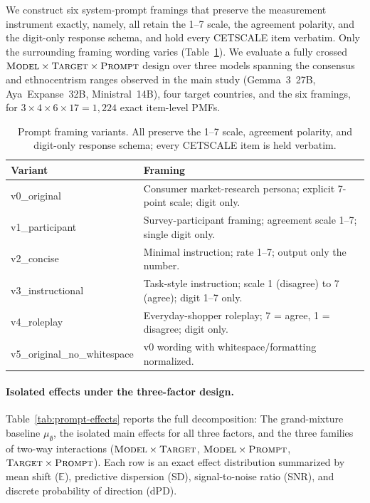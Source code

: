 We construct six system-prompt framings that preserve the measurement instrument exactly, namely, all retain the 1--7 scale, the agreement polarity, and the digit-only response schema, and hold every CETSCALE item verbatim. 
Only the surrounding framing wording varies (Table~\ref{tab:prompt-variants}). 
We evaluate a fully crossed $\textsc{Model}\times\textsc{Target}\times\textsc{Prompt}$ design over three models spanning the consensus and ethnocentrism ranges observed in the main study (Gemma~3~27B, Aya~Expanse~32B, Ministral~14B), four target countries, and the six framings, for $3\times4\times6\times17=1{,}224$ exact item-level PMFs.

\begin{table}[htbp]
  \caption{Prompt framing variants. All preserve the 1--7 scale, agreement
  polarity, and digit-only response schema; every CETSCALE item is held verbatim.}
  \label{tab:prompt-variants}
  \centering
  \begin{small}
  \begin{tabular}{@{}p{3.4cm}p{8.6cm}@{}}
    \toprule
    \textbf{Variant} & \textbf{Framing} \\
    \midrule
    v0\_original & Consumer market-research persona; explicit 7-point scale; digit only. \\
    v1\_participant & Survey-participant framing; agreement scale 1--7; single digit only. \\
    v2\_concise & Minimal instruction; rate 1--7; output only the number. \\
    v3\_instructional & Task-style instruction; scale 1 (disagree) to 7 (agree); digit 1--7 only. \\
    v4\_roleplay & Everyday-shopper roleplay; 7 = agree, 1 = disagree; digit only. \\
    v5\_original\_no\_whitespace & v0 wording with whitespace/formatting normalized. \\
    \bottomrule
  \end{tabular}
  \end{small}
\end{table}

\paragraph{Isolated effects under the three-factor design.}
Table~\ref{tab:prompt-effects} reports the full decomposition: 
The grand-mixture baseline $\mu_\emptyset$, the isolated main effects for all three factors, and the
three families of two-way interactions
($\textsc{Model}\times\textsc{Target}$, $\textsc{Model}\times\textsc{Prompt}$,
$\textsc{Target}\times\textsc{Prompt}$). 
Each row is an exact effect distribution summarized by mean shift ($\mathbb{E}$), predictive dispersion (SD),
signal-to-noise ratio (SNR), and discrete probability of direction (dPD).

